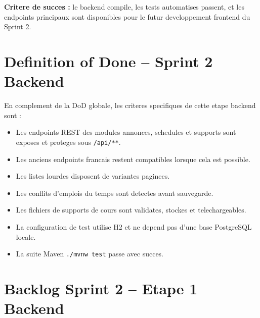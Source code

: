 \documentclass[12pt,a4paper]{report}
\begin{document}
\textbf{Critere de succes :} le backend compile, les tests automatises passent, et les endpoints principaux sont disponibles pour le futur developpement frontend du Sprint 2.

\section{Definition of Done -- Sprint 2 Backend}

En complement de la DoD globale, les criteres specifiques de cette etape backend sont :

\begin{itemize}[itemsep=0.4em]
    \item Les endpoints REST des modules annonces, schedules et supports sont exposes et proteges sous \texttt{/api/**}.
    \item Les anciens endpoints francais restent compatibles lorsque cela est possible.
    \item Les listes lourdes disposent de variantes paginees.
    \item Les conflits d'emplois du temps sont detectes avant sauvegarde.
    \item Les fichiers de supports de cours sont validates, stockes et telechargeables.
    \item La configuration de test utilise H2 et ne depend pas d'une base PostgreSQL locale.
    \item La suite Maven \texttt{./mvnw test} passe avec succes.
\end{itemize}

\section{Backlog Sprint 2 -- Etape 1 Backend}
\end{document}
